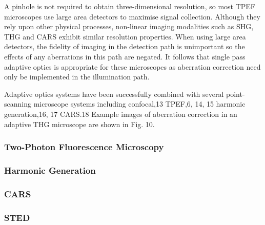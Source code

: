 A pinhole is not required to obtain three-dimensional resolution, so most 
TPEF microscopes use large area detectors to maximise signal collection. 
Although they rely upon other physical processes, non-linear imaging 
modalities such as SHG, THG and CARS exhibit similar resolution properties. 
When using large area detectors, the fidelity of imaging in the detection 
path is unimportant so the effects of any aberrations in this path are 
negated. It follows that single pass adaptive optics is appropriate for these 
microscopes as aberration correction need only be implemented in the 
illumination path.

Adaptive optics systems have been successfully combined with several point-
scanning microscope systems including confocal,13 TPEF,6, 14, 15 harmonic 
generation,16, 17 CARS.18 Example images of aberration correction in an 
adaptive THG microscope are shown in Fig. 10.

\cite{book_confocal}
\cite{AOM_scan_CFM}


\subsubsection{Two-Photon Fluorescence Microscopy}
\label{sec:twoPhotonExcitation}

\cite{TPFM_gated_wavefront}
\cite{TPFM_image_based}
\cite{TPFM_pratical}

\subsubsection{Harmonic Generation}
\label{sec:HarmonicGeneration}

\cite{HG_embryos}
\cite{HG_dynamic}


\subsubsection{CARS}
\label{sec:CARS}

\cite{CARS}

\subsubsection{STED}
\label{sec:STED}

\cite{AOM_scan_STED}



